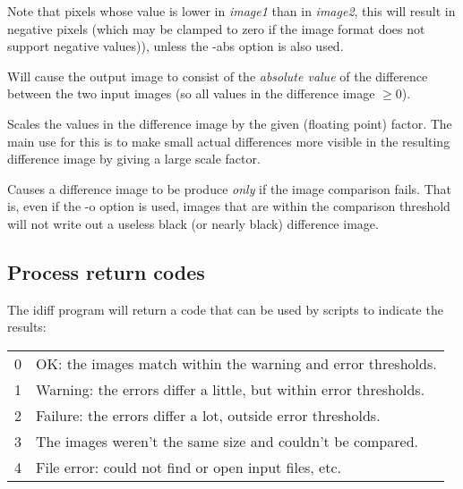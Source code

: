 Note that pixels whose value is lower in \emph{image1} than in
\emph{image2}, this will result in negative pixels (which may be clamped
to zero if the image format does not support negative values)), unless
the {\cf -abs} option is also used.  
\apiend

Will cause the output image to consist of the \emph{absolute value}
of the difference between the two input images (so all values in the
difference image $\ge 0$).
\apiend

Scales the values in the difference image by the given (floating point)
factor.  The main use for this is to make small actual differences more
visible in the resulting difference image by giving a large scale factor.
\apiend

Causes a difference image to be produce \emph{only} if the image
comparison fails.  That is, even if the {\cf -o} option is used,
images that are within the comparison threshold will not write out
a useless black (or nearly black) difference image.
\apiend

\subsection*{Process return codes}

The {\cf idiff} program will return a code that can be used by scripts
to indicate the results:

\medskip

\begin{tabular}{p{0.3in} p{5in}}
0 & OK: the images match within the warning and error
thresholds. \\
1 & Warning: the errors differ a little, but within error thresholds. \\ 
2 & Failure: the errors differ a lot, outside error thresholds. \\
3 & The images weren't the same size and couldn't be compared. \\
4 & File error: could not find or open input files, etc.
\end{tabular}

